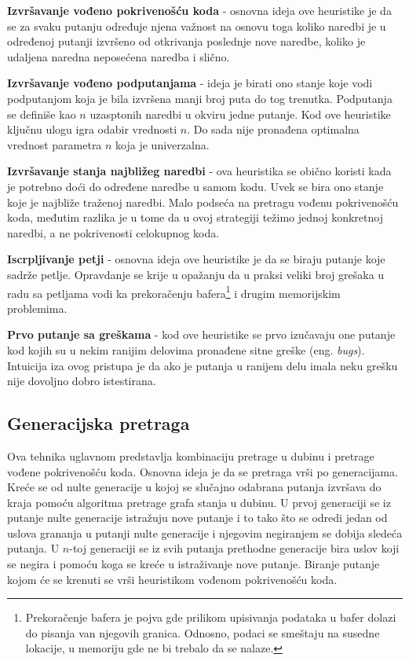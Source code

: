 \documentclass[12pt,oneside]{memoir}
\begin{document}
\begin{description}
    \item \textbf{Izvršavanje vođeno pokrivenošću koda} - osnovna ideja ove heuristike je da se za svaku putanju određuje njena važnost na osnovu toga koliko naredbi je u određenoj putanji izvršeno od otkrivanja poslednje nove naredbe, koliko je udaljena naredna neposećena naredba i slično.
    
    \item \textbf{Izvršavanje vođeno podputanjama} - ideja je birati ono stanje koje vodi podputanjom koja je bila izvršena manji broj puta do tog trenutka. Podputanja se definiše kao $n$ uzasptonih naredbi u okviru jedne putanje. Kod ove heuristike ključnu ulogu igra odabir vrednosti $n$. Do sada nije pronađena optimalna vrednost parametra $n$ koja je univerzalna.
    
    \item \textbf{Izvršavanje stanja najbližeg naredbi} - ova heuristika se obično koristi kada je potrebno doći do određene naredbe u samom kodu. Uvek se bira ono stanje koje je najbliže traženoj naredbi. Malo podseća na pretragu vođenu pokrivenošću koda, međutim razlika je u tome da u ovoj strategiji težimo jednoj konkretnoj naredbi, a ne pokrivenosti celokupnog koda.
    
    \item \textbf{Iscrpljivanje petji} - osnovna ideja ove heuristike je da se biraju putanje koje sadrže petlje. Opravdanje se krije u opažanju da u praksi veliki broj grešaka u radu sa petljama vodi ka prekoračenju bafera\footnote[3]{Prekoračenje bafera je pojva gde prilikom upisivanja podataka u bafer dolazi do pisanja van njegovih granica. Odnosno, podaci se smeštaju na susedne lokacije, u memoriju gde ne bi trebalo da se nalaze.} i drugim memorijskim problemima.
    
    \item \textbf{Prvo putanje sa greškama} - kod ove heuristike se prvo izučavaju one putanje kod kojih su u nekim ranijim delovima pronađene sitne greške (eng. \textit{bugs}). Intuicija iza ovog pristupa je da ako je putanja u ranijem delu imala neku grešku nije dovoljno dobro istestirana.
\end{description}

\subsection{Generacijska pretraga} 
Ova tehnika uglavnom predstavlja kombinaciju pretrage u dubinu i pretrage vođene pokrivenošću koda. Osnovna ideja je da se pretraga vrši po generacijama. Kreće se od nulte generacije u kojoj se slučajno odabrana putanja izvršava do kraja pomoću algoritma pretrage grafa stanja u dubinu. U prvoj generaciji se iz putanje nulte generacije istražuju nove putanje i to tako što se odredi jedan od uslova grananja u putanji nulte generacije i njegovim negiranjem se dobija sledeća putanja. U $n$-toj generaciji se iz svih putanja prethodne generacije bira uslov koji se negira i pomoću koga se kreće u istraživanje nove putanje. Biranje putanje kojom će se krenuti se vrši heuristikom vođenom pokrivenošću koda.
\bigskip
\end{document}
